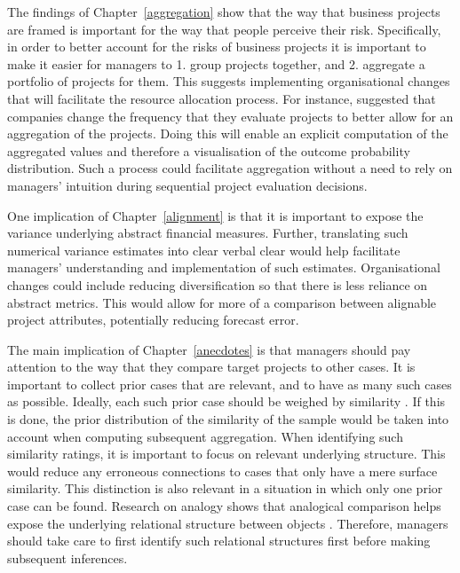 \documentclass[a4paper, nobind, dvipsnames]{templates/ociamthesis}
\theoremstyle{definition}
\theoremstyle{definition}
\theoremstyle{definition}
\theoremstyle{definition}
\theoremstyle{remark}
\begin{document}
The findings of Chapter~\ref{aggregation} show that the way that business
projects are framed is important for the way that people perceive their risk.
Specifically, in order to better account for the risks of business projects it
is important to make it easier for managers to 1. group projects together,
and 2. aggregate a portfolio of projects for them. This suggests implementing
organisational changes that will facilitate the resource allocation process. For
instance, \textcite{lovallo2020} suggested that companies change the frequency that they
evaluate projects to better allow for an aggregation of the projects. Doing this
will enable an explicit computation of the aggregated values and therefore a
visualisation of the outcome probability distribution. Such a process could
facilitate aggregation without a need to rely on managers' intuition during
sequential project evaluation decisions.

One implication of Chapter~\ref{alignment} is that it is important to expose
the variance underlying abstract financial measures. Further, translating such
numerical variance estimates into clear verbal clear would help facilitate
managers' understanding and implementation of such estimates. Organisational
changes could include reducing diversification so that there is less reliance on
abstract metrics. This would allow for more of a comparison between alignable
project attributes, potentially reducing forecast error.

The main implication of Chapter~\ref{anecdotes} is that managers should pay
attention to the way that they compare target projects to other cases. It is
important to collect prior cases that are relevant, and to have as many such
cases as possible. Ideally, each such prior case should be weighed by similarity
\autocite{lovallo2012}. If this is done, the prior distribution of the similarity of the
sample would be taken into account when computing subsequent aggregation. When
identifying such similarity ratings, it is important to focus on relevant
underlying structure. This would reduce any erroneous connections to cases that
only have a mere surface similarity. This distinction is also relevant in a
situation in which only one prior case can be found. Research on analogy shows
that analogical comparison helps expose the underlying relational structure
between objects \autocites[e.g.,][]{kurtz2013,markman1993}. Therefore, managers should
take care to first identify such relational structures first before making
subsequent inferences.
\end{document}
